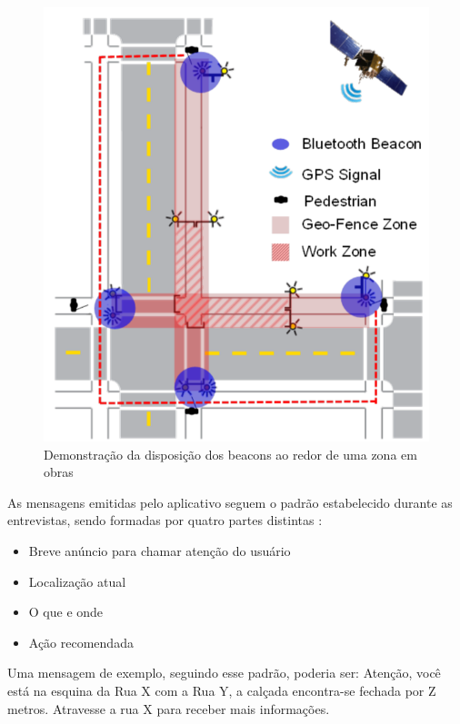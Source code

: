 \documentclass[english,brazilian]{UNISINOSmonografia}
\begin{document}
\FloatBarrier
\begin{figure}
	\caption{Demonstração da disposição dos beacons ao redor de uma zona em obras}
	\label{fig:workzoneScheme}
	\centering%
	\begin{minipage}{.4\textwidth}
		\includegraphics[width=\textwidth]{imgs/workzoneSchema}
		\end{minipage}
\end{figure}
\FloatBarrier

As mensagens emitidas pelo aplicativo seguem o padrão estabelecido durante as entrevistas, sendo formadas por quatro partes distintas \cite{chen2014}:
\begin{itemize}
	\item Breve anúncio para chamar atenção do usuário
	\item Localização atual
	\item O que e onde
	\item Ação recomendada
\end{itemize}

Uma mensagem de exemplo, seguindo esse padrão, poderia ser: Atenção, você está na esquina da Rua X com a Rua Y, a calçada encontra-se fechada por Z metros. Atravesse a rua X para receber mais informações.
\end{document}
